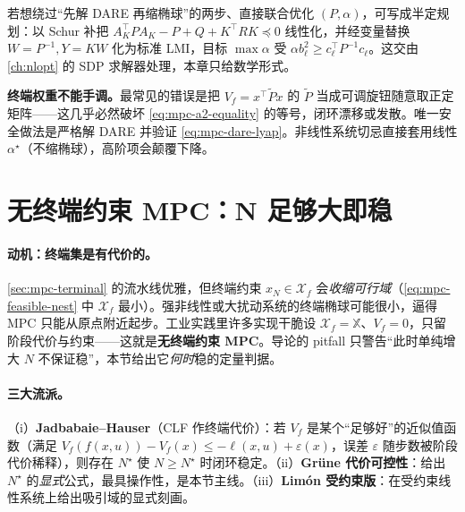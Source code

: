 \begin{remark}
若想绕过“先解 DARE 再缩椭球”的两步、直接联合优化 $(P,\alpha)$，可写成半定规划：以 Schur 补把 $A_K^\top PA_K-P+Q+K^\top RK\preceq0$ 线性化，并经变量替换 $W=P^{-1},Y=KW$ 化为标准 LMI，目标 $\max\alpha$ 受 $\alpha b_\ell^2\ge c_\ell^\top P^{-1}c_\ell$。这交由 \cref{ch:nlopt} 的 SDP 求解器处理，本章只给数学形式。
\end{remark}

\begin{pitfall}
\textbf{终端权重不能手调。}\;最常见的错误是把 $V_f=x^\top \tilde Px$ 的 $\tilde P$ 当成可调旋钮随意取正定矩阵——这几乎必然破坏 \cref{eq:mpc-a2-equality} 的等号，闭环漂移或发散。唯一安全做法是严格解 DARE 并验证 \cref{eq:mpc-dare-lyap}。非线性系统切忌直接套用线性 $\alpha^\star$（不缩椭球），高阶项会颠覆下降。
\end{pitfall}

\section{无终端约束 MPC：N 足够大即稳}
\label{sec:mpc-noterminal}

\paragraph{动机：终端集是有代价的。}
\cref{sec:mpc-terminal} 的流水线优雅，但终端约束 $x_N\in\mathcal X_f$ 会\emph{收缩可行域}（\cref{eq:mpc-feasible-nest} 中 $\mathcal X_f$ 最小）。强非线性或大扰动系统的终端椭球可能很小，逼得 MPC 只能从原点附近起步。工业实践里许多实现干脆设 $\mathcal X_f=\mathbb X$、$V_f=0$，只留阶段代价与约束——这就是\textbf{无终端约束 MPC}。导论的 pitfall 只警告“此时单纯增大 $N$ 不保证稳”，本节给出它\emph{何时}稳的定量判据。

\paragraph{三大流派。}
（i）\textbf{Jadbabaie--Hauser}（CLF 作终端代价\cite{jadbabaie2005receding}）：若 $V_f$ 是某个“足够好”的近似值函数（满足 $V_f(f(x,u))-V_f(x)\le-\ell(x,u)+\varepsilon(x)$，误差 $\varepsilon$ 随步数被阶段代价稀释），则存在 $N^\star$ 使 $N\ge N^\star$ 时闭环稳定。（ii）\textbf{Grüne 代价可控性}\cite{gruene2009analysis,gruenepannek2017nmpc}：给出 $N^\star$ 的\emph{显式}公式，最具操作性，是本节主线。（iii）\textbf{Limón 受约束版}\cite{limon2006stability}：在受约束线性系统上给出吸引域的显式刻画。

